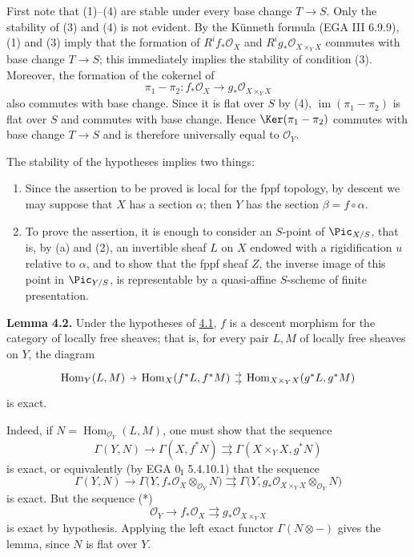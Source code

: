 First note that (1)--(4) are stable under every base change $T\to S$. Only
the stability of (3) and (4) is not evident. By the K\"unneth formula (EGA III
6.9.9), (1) and (3) imply that the formation of $R^if_*\mathcal O_X$ and
$R^ig_*\mathcal O_{X\times_YX}$ commutes with base change $T\to S$; this
immediately implies the stability of condition (3). Moreover, the formation
of the cokernel of
\[
  \pi_1-\pi_2:f_*\mathcal O_X
  \longrightarrow g_*\mathcal O_{X\times_YX}
\]
also commutes with base change. Since it is flat over $S$ by (4),
$\operatorname{im}(\pi_1-\pi_2)$ is flat over $S$ and commutes with base
change. Hence $\Ker(\pi_1-\pi_2)$ commutes with base change $T\to S$ and is
therefore universally equal to $\mathcal O_Y$.

The stability of the hypotheses implies two things:
\begin{enumerate}[label=\alph*.]
\item Since the assertion to be proved is local for the fppf topology, by
  descent we may suppose that $X$ has a section $\alpha$; then $Y$ has the
  section $\beta=f\circ\alpha$.
\item To prove the assertion, it is enough to consider an $S$-point of
  $\Pic_{X/S}$, that is, by (a) and (2), an invertible sheaf $L$ on $X$
  endowed with a rigidification $u$ relative to $\alpha$, and to show that
  the fppf sheaf $Z$, the inverse image of this point in $\Pic_{Y/S}$, is
  representable by a quasi-affine $S$-scheme of finite presentation.
\end{enumerate}

\textbf{Lemma 4.2.} Under the hypotheses of \hyperlink{sga6.e12.prop.4-1}{4.1}, $f$ is a descent morphism
for the category of locally free sheaves; that is, for every pair $L,M$ of
locally free sheaves on $Y$, the diagram
\[
\begin{tikzcd}[column sep=tiny]
\operatorname{Hom}_Y(L,M) \arrow[r] &
  \operatorname{Hom}_X(f^*L,f^*M)
    \arrow[r,shift left=.7ex] \arrow[r,shift right=.7ex] &
  \operatorname{Hom}_{X\times_YX}(g^*L,g^*M)
\end{tikzcd}
\]
is exact.

Indeed, if $N=\operatorname{Hom}_{\mathcal O_Y}(L,M)$, one must show that the sequence
\[
  \Gamma(Y,N)\longrightarrow\Gamma(X,f^*N)
  \rightrightarrows\Gamma(X\times_YX,g^*N)
\]
is exact, or equivalently (by EGA $0_{\mathrm I}$ 5.4.10.1) that the sequence
\[
  \Gamma(Y,N)
  \longrightarrow
  \Gamma\bigl(Y,f_*\mathcal O_X\otimes_{\mathcal O_Y}N\bigr)
  \rightrightarrows
  \Gamma\bigl(Y,g_*\mathcal O_{X\times_YX}
    \otimes_{\mathcal O_Y}N\bigr)
\]
is exact. But the sequence (*)
\[
  \mathcal O_Y\longrightarrow f_*\mathcal O_X
  \rightrightarrows g_*\mathcal O_{X\times_YX}
\]
is exact by hypothesis. Applying the left exact functor
$\Gamma(N\otimes -)$ gives the lemma, since $N$ is flat over $Y$.


